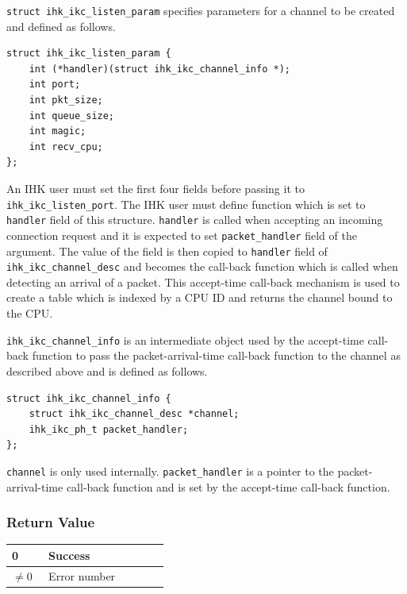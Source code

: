 \documentclass[twoside,11pt,fleqn]{book}
\begin{document}
\texttt{struct ihk\_ikc\_listen\_param} specifies parameters for a channel to be created and defined as follows.
\begin{verbatim}
struct ihk_ikc_listen_param {
    int (*handler)(struct ihk_ikc_channel_info *);
    int port;
    int pkt_size;
    int queue_size;
    int magic;
    int recv_cpu;
};
\end{verbatim}
\begin{structdef}
\end{structdef}
An IHK user must set the first four fields before passing it to \texttt{ihk\_ikc\_listen\_port}.
The IHK user must define function which is set to \texttt{handler} field of this structure.
\texttt{handler} is called when accepting an incoming connection request and it is expected to set \texttt{packet\_handler} field of the argument.
The value of the field is then copied to \texttt{handler} field of \texttt{ihk\_ikc\_channel\_desc} and becomes the call-back function which is called when detecting an arrival of a packet.
This accept-time call-back mechanism is used to create a table which is indexed by a CPU ID and returns the channel bound to the CPU.

\texttt{ihk\_ikc\_channel\_info} is an intermediate object used by the accept-time call-back function to pass the packet-arrival-time call-back function to the channel as described above and is defined as follows.
\begin{verbatim}
struct ihk_ikc_channel_info {
    struct ihk_ikc_channel_desc *channel;
    ihk_ikc_ph_t packet_handler;
};
\end{verbatim}
\texttt{channel} is only used internally.
\texttt{packet\_handler} is a pointer to the packet-arrival-time call-back function and is set by the accept-time call-back function.

\subsubsection*{Return Value}{\quad}
\begin{table}[!h]
\footnotesize
\begin{tabular}{|p{0.20\linewidth}|p{0.66\linewidth}|} \hline
0&Success\\ \hline
$\ne 0$&Error number\\ \hline
\end{tabular}
\vspace{-0em}
\end{table}
\FloatBarrier
\end{document}
